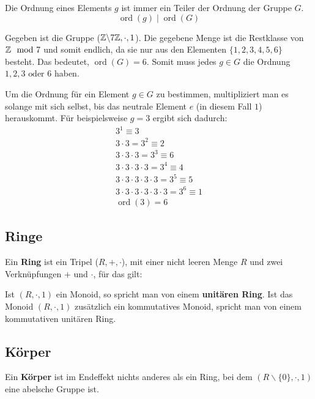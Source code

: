 \documentclass[11pt]{article}
\begin{document}
\begin{anmk}
  Die Ordnung eines Elements $g$ ist immer ein Teiler der Ordnung der Gruppe $G$.
  \[
    \operatorname{ord}(g) \mid \operatorname{ord}(G)
  \]
\end{anmk}
\begin{bsp}
  Gegeben ist die Gruppe ($\mathbb{Z}\backslash7\mathbb{Z}, \cdot, 1$). Die gegebene Menge ist die Restklasse von $\mathbb{Z} \mod 7$ und somit
  endlich, da sie nur aus den Elementen $\{1, 2, 3, 4, 5, 6\}$ besteht. Das bedeutet, $\operatorname{ord}(G) = 6$. Somit
  muss jedes $g \in G$ die Ordnung $1, 2, 3 \text{ oder } 6$ haben.

  Um die Ordnung für ein Element $g \in G$ zu bestimmen, multipliziert man es solange mit sich selbst, bis das neutrale
  Element $e$ (in diesem Fall $1$) herauskommt. Für beispielsweise $g = 3$ ergibt sich dadurch:
  \begin{align*}
    3^1 \equiv 3                                             \\
    3 \cdot 3 = 3^2 \equiv 2                                 \\
    3 \cdot 3 \cdot 3 = 3^3 \equiv 6                         \\
    3 \cdot 3 \cdot 3 \cdot 3 = 3^4 \equiv 4                 \\
    3 \cdot 3 \cdot 3 \cdot 3 \cdot 3 = 3^5 \equiv 5         \\
    3 \cdot 3 \cdot 3 \cdot 3 \cdot 3 \cdot 3 = 3^6 \equiv 1 \\
    \operatorname{ord}(3) = 6
  \end{align*}
\end{bsp}

\subsection{Ringe}
Ein \textbf{Ring} ist ein Tripel ($R, +, \cdot$), mit einer nicht leeren Menge $R$ und zwei Verknüpfungen $+$ und $\cdot$,
für das gilt:
\ul{
}

Ist $(R, \cdot, 1)$ ein Monoid, so spricht man von einem \textbf{unitären Ring}.
Ist das Monoid $(R, \cdot, 1)$ zusätzlich ein kommutatives Monoid, spricht man von einem kommutativen unitären Ring.

\subsection{Körper}
Ein \textbf{Körper} ist im Endeffekt nichts anderes als ein Ring, bei dem $(R\backslash\{0\}, \cdot, 1)$ eine abelsche
Gruppe ist.
\end{document}
